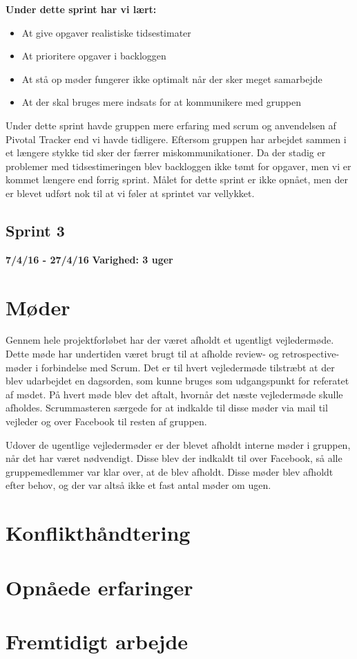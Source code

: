 	\textbf{Under dette sprint har vi lært:}
	\begin{itemize}
		\item At give opgaver realistiske tidsestimater
		\item At prioritere opgaver i backloggen
		\item At stå op møder fungerer ikke optimalt når der sker meget samarbejde
		\item At der skal bruges mere indsats for at kommunikere med gruppen 
	\end{itemize}
	
	Under dette sprint havde gruppen mere erfaring med scrum og anvendelsen af Pivotal Tracker end vi havde tidligere. Eftersom gruppen har arbejdet sammen i et længere stykke tid sker der færrer miskommunikationer. Da der stadig er problemer med tidsestimeringen blev backloggen ikke tømt for opgaver, men vi er kommet længere end forrig sprint. Målet for dette sprint er ikke opnået, men der er blevet udført nok til at vi føler at sprintet var vellykket.
	
	\subsection{Sprint 3}
	\textbf{7/4/16 - 27/4/16}\newline
	\textbf{Varighed: 3 uger}

\section{Møder}
Gennem hele projektforløbet har der været afholdt et ugentligt vejledermøde. Dette møde har undertiden været brugt til at afholde review- og retrospective-møder i forbindelse med Scrum. Det er til hvert vejledermøde tilstræbt at der blev udarbejdet en dagsorden, som kunne bruges som udgangspunkt for referatet af mødet. På hvert møde blev det aftalt, hvornår det næste vejledermøde skulle afholdes. Scrummasteren særgede for at indkalde til disse møder via mail til vejleder og over Facebook til resten af gruppen. 

Udover de ugentlige vejledermøder er der blevet afholdt interne møder i gruppen, når det har været nødvendigt. Disse blev der indkaldt til over Facebook, så alle gruppemedlemmer var klar over, at de blev afholdt. Disse møder blev afholdt efter behov, og der var altså ikke et fast antal møder om ugen. 


\section{Konflikthåndtering}

\section{Opnåede erfaringer}

\section{Fremtidigt arbejde}
